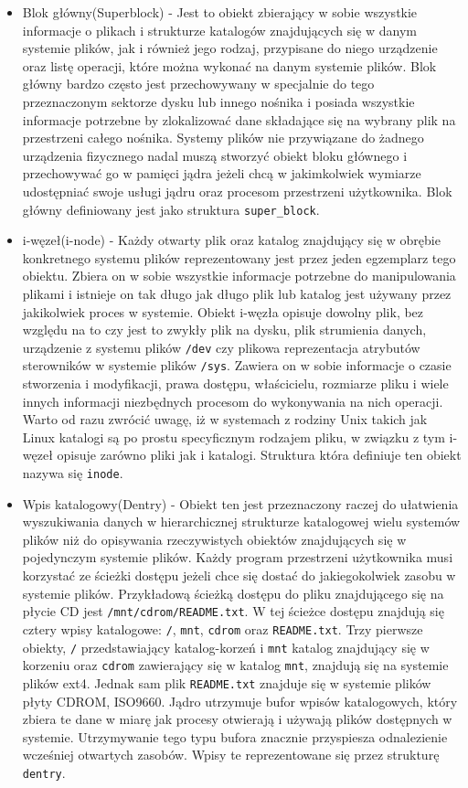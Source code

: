 \documentclass[10pt]{scrartcl}
\begin{document}
\begin{itemize}
\item
  Blok główny(Superblock) - Jest to obiekt zbierający w sobie wszystkie informacje o plikach i strukturze katalogów znajdujących się w danym systemie plików, jak i również jego rodzaj, przypisane do niego urządzenie oraz listę operacji, które można wykonać na danym systemie plików. Blok główny bardzo często jest przechowywany w specjalnie do tego przeznaczonym sektorze dysku lub innego nośnika i posiada wszystkie informacje potrzebne by zlokalizować dane składające się na wybrany plik na przestrzeni całego nośnika. Systemy plików nie przywiązane do żadnego urządzenia fizycznego nadal muszą stworzyć obiekt bloku głównego i przechowywać go w pamięci jądra jeżeli chcą w jakimkolwiek wymiarze udostępniać swoje usługi jądru oraz procesom przestrzeni użytkownika. Blok główny definiowany jest jako struktura \texttt{super\_block}.
\item
  i-węzeł(i-node) - Każdy otwarty plik oraz katalog znajdujący się w obrębie konkretnego systemu plików reprezentowany jest przez jeden egzemplarz tego obiektu. Zbiera on w sobie wszystkie informacje potrzebne do manipulowania plikami i istnieje on tak długo jak długo plik lub katalog jest używany przez jakikolwiek proces w systemie.  Obiekt i-węzła opisuje dowolny plik, bez względu na to czy jest to zwykły plik na dysku, plik strumienia danych, urządzenie z systemu plików \texttt{/dev} czy plikowa reprezentacja atrybutów sterowników w systemie plików \texttt{/sys}. Zawiera on w sobie informacje o czasie stworzenia i modyfikacji, prawa dostępu, właścicielu, rozmiarze pliku i wiele innych informacji niezbędnych procesom do wykonywania na nich operacji. Warto od razu zwrócić uwagę, iż w systemach z rodziny Unix takich jak Linux katalogi są po prostu specyficznym rodzajem pliku, w związku z tym i-węzeł opisuje zarówno pliki jak i katalogi. Struktura która definiuje ten obiekt nazywa się \texttt{inode}.
\item
  Wpis katalogowy(Dentry) - Obiekt ten jest przeznaczony raczej do ułatwienia wyszukiwania danych w hierarchicznej strukturze katalogowej wielu systemów plików niż do opisywania rzeczywistych obiektów znajdujących się w pojedynczym systemie plików. Każdy program przestrzeni użytkownika musi korzystać ze ścieżki dostępu jeżeli chce się dostać do jakiegokolwiek zasobu w systemie plików. Przykładową ścieżką dostępu do pliku znajdującego się na płycie CD jest \texttt{/mnt/cdrom/README.txt}. W tej ścieżce dostępu znajdują się cztery wpisy katalogowe: \texttt{/}, \texttt{mnt}, \texttt{cdrom} oraz \texttt{README.txt}. Trzy pierwsze obiekty, \texttt{/} przedstawiający katalog-korzeń i \texttt{mnt} katalog znajdujący się w korzeniu oraz \texttt{cdrom} zawierający się w katalog \texttt{mnt}, znajdują się na systemie plików ext4. Jednak sam plik \texttt{README.txt} znajduje się w systemie plików płyty CDROM, ISO9660. Jądro utrzymuje bufor wpisów katalogowych, który zbiera te dane w miarę jak procesy otwierają i używają plików dostępnych w systemie. Utrzymywanie tego typu bufora znacznie przyspiesza odnalezienie wcześniej otwartych zasobów. Wpisy te reprezentowane się przez strukturę \texttt{dentry}.

\end{itemize}
\end{document}
